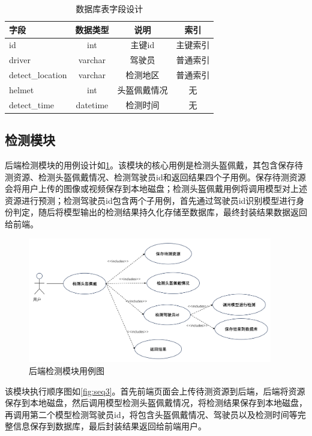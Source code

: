 \begin{table}[htbp]
    \centering
    \caption{数据库表字段设计} %
    \label{tab:datatable}
    \begin{tabular}{lccc} %
        \toprule %
        字段 & 数据类型 & 说明 & 索引 \\
        \midrule %
        id & int & 主键id & 主键索引 \\
        driver & varchar & 驾驶员 & 普通索引\\
        detect\_location & varchar & 检测地区 & 普通索引 \\
        helmet & int & 头盔佩戴情况 & 无 \\
        detect\_time & datetime & 检测时间 & 无 \\
        \bottomrule %
    \end{tabular}
\end{table}

\subsection{检测模块}

后端检测模块的用例设计如\ref{fig:uml3}。该模块的核心用例是检测头盔佩戴，其包含保存待测资源、检测头盔佩戴情况、检测驾驶员id和返回结果四个子用例。保存待测资源会将用户上传的图像或视频保存到本地磁盘；检测头盔佩戴用例将调用模型对上述资源进行预测；检测驾驶员id包含两个子用例，首先通过驾驶员id识别模型进行身份判定，随后将模型输出的检测结果持久化存储至数据库，最终封装结果数据返回给前端。
\begin{figure}[!htb]
    \centering
    \includegraphics[width=0.95\textwidth]{figs/chap05/uml3.png}
    \caption{后端检测模块用例图}
    \label{fig:uml3}
\end{figure}

该模块执行顺序图如\ref{fig:seq3}。首先前端页面会上传待测资源到后端，后端将资源保存到本地磁盘，然后调用模型检测头盔佩戴情况，将检测结果保存到本地磁盘，再调用第二个模型检测驾驶员id，将包含头盔佩戴情况、驾驶员以及检测时间等完整信息保存到数据库，最后封装结果返回给前端用户。

